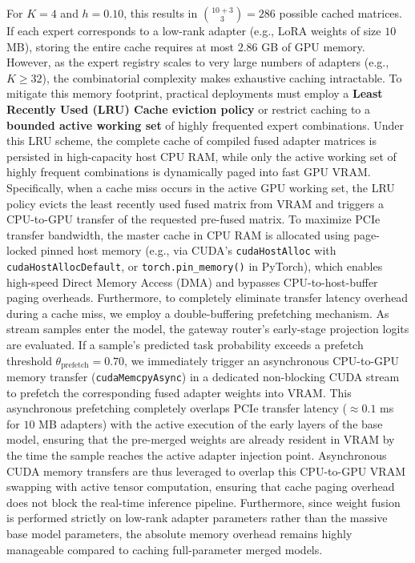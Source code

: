 \documentclass{article}
\theoremstyle{plain}
\theoremstyle{definition}
\theoremstyle{remark}
\begin{document}
For $K=4$ and $h=0.10$, this results in $\binom{10 + 3}{3} = 286$ possible cached matrices. If each expert corresponds to a low-rank adapter (e.g., LoRA weights of size $10$ MB), storing the entire cache requires at most $2.86$ GB of GPU memory. However, as the expert registry scales to very large numbers of adapters (e.g., $K \ge 32$), the combinatorial complexity makes exhaustive caching intractable. To mitigate this memory footprint, practical deployments must employ a \textbf{Least Recently Used (LRU) Cache eviction policy} or restrict caching to a \textbf{bounded active working set} of highly frequented expert combinations. Under this LRU scheme, the complete cache of compiled fused adapter matrices is persisted in high-capacity host CPU RAM, while only the active working set of highly frequent combinations is dynamically paged into fast GPU VRAM. Specifically, when a cache miss occurs in the active GPU working set, the LRU policy evicts the least recently used fused matrix from VRAM and triggers a CPU-to-GPU transfer of the requested pre-fused matrix. To maximize PCIe transfer bandwidth, the master cache in CPU RAM is allocated using page-locked pinned host memory (e.g., via CUDA's \texttt{cudaHostAlloc} with \texttt{cudaHostAllocDefault}, or \texttt{torch.pin\_memory()} in PyTorch), which enables high-speed Direct Memory Access (DMA) and bypasses CPU-to-host-buffer paging overheads. Furthermore, to completely eliminate transfer latency overhead during a cache miss, we employ a double-buffering prefetching mechanism. As stream samples enter the model, the gateway router's early-stage projection logits are evaluated. If a sample's predicted task probability exceeds a prefetch threshold $\theta_{\text{prefetch}} = 0.70$, we immediately trigger an asynchronous CPU-to-GPU memory transfer (\texttt{cudaMemcpyAsync}) in a dedicated non-blocking CUDA stream to prefetch the corresponding fused adapter weights into VRAM. This asynchronous prefetching completely overlaps PCIe transfer latency ($\approx 0.1$ ms for $10$ MB adapters) with the active execution of the early layers of the base model, ensuring that the pre-merged weights are already resident in VRAM by the time the sample reaches the active adapter injection point. Asynchronous CUDA memory transfers are thus leveraged to overlap this CPU-to-GPU VRAM swapping with active tensor computation, ensuring that cache paging overhead does not block the real-time inference pipeline. Furthermore, since weight fusion is performed strictly on low-rank adapter parameters rather than the massive base model parameters, the absolute memory overhead remains highly manageable compared to caching full-parameter merged models.
\end{document}
